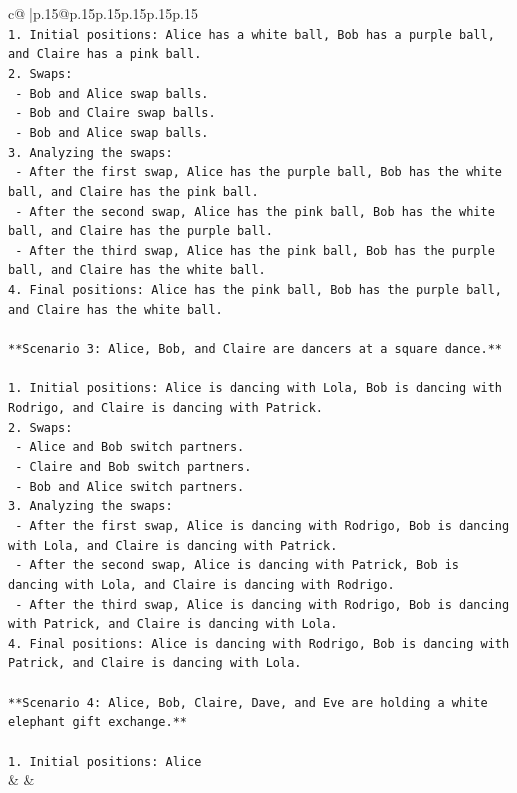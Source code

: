 \documentclass{article}
\begin{document}
{\begin{supertabular}{c@{$\;$}|p{.15\linewidth}@{}p{.15\linewidth}p{.15\linewidth}p{.15\linewidth}p{.15\linewidth}p{.15\linewidth}}
{{{\\ 
\texttt{1. Initial positions: Alice has a white ball, Bob has a purple ball, and Claire has a pink ball.} \\
\texttt{2. Swaps:} \\
\texttt{   {-} Bob and Alice swap balls.} \\
\texttt{   {-} Bob and Claire swap balls.} \\
\texttt{   {-} Bob and Alice swap balls.} \\
\texttt{3. Analyzing the swaps:} \\
\texttt{   {-} After the first swap, Alice has the purple ball, Bob has the white ball, and Claire has the pink ball.} \\
\texttt{   {-} After the second swap, Alice has the pink ball, Bob has the white ball, and Claire has the purple ball.} \\
\texttt{   {-} After the third swap, Alice has the pink ball, Bob has the purple ball, and Claire has the white ball.} \\
\texttt{4. Final positions: Alice has the pink ball, Bob has the purple ball, and Claire has the white ball.} \\
\\ 
\texttt{**Scenario 3: Alice, Bob, and Claire are dancers at a square dance.**} \\
\\ 
\texttt{1. Initial positions: Alice is dancing with Lola, Bob is dancing with Rodrigo, and Claire is dancing with Patrick.} \\
\texttt{2. Swaps:} \\
\texttt{   {-} Alice and Bob switch partners.} \\
\texttt{   {-} Claire and Bob switch partners.} \\
\texttt{   {-} Bob and Alice switch partners.} \\
\texttt{3. Analyzing the swaps:} \\
\texttt{   {-} After the first swap, Alice is dancing with Rodrigo, Bob is dancing with Lola, and Claire is dancing with Patrick.} \\
\texttt{   {-} After the second swap, Alice is dancing with Patrick, Bob is dancing with Lola, and Claire is dancing with Rodrigo.} \\
\texttt{   {-} After the third swap, Alice is dancing with Rodrigo, Bob is dancing with Patrick, and Claire is dancing with Lola.} \\
\texttt{4. Final positions: Alice is dancing with Rodrigo, Bob is dancing with Patrick, and Claire is dancing with Lola.} \\
\\ 
\texttt{**Scenario 4: Alice, Bob, Claire, Dave, and Eve are holding a white elephant gift exchange.**} \\
\\ 
\texttt{1. Initial positions: Alice} \\
            }
        }
    }
    & & \\ \\


\end{supertabular}}
\end{document}
